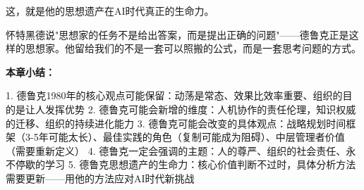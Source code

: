 这，就是他的思想遗产在AI时代真正的生命力。

怀特黑德说"思想家的任务不是给出答案，而是提出正确的问题"——德鲁克正是这样的思想家。他留给我们的不是一套可以照搬的公式，而是一套思考问题的方式。


\textbf{本章小结：}

1. 德鲁克1980年的核心观点可能保留：动荡是常态、效果比效率重要、组织的目的是让人发挥优势
2. 德鲁克可能会新增的维度：人机协作的责任伦理，知识权威的迁移、组织的持续进化能力
3. 德鲁克可能会改变的具体观点：战略规划时间框架（3-5年可能太长）、最佳实践的角色（复制可能成为阻碍）、中层管理者价值（需要重新定义）
4. 德鲁克一定会强调的主题：人的尊严、组织的社会责任、永不停歇的学习
5. 德鲁克思想遗产的生命力：核心价值判断不过时，具体分析方法需要更新——用他的方法应对AI时代新挑战

